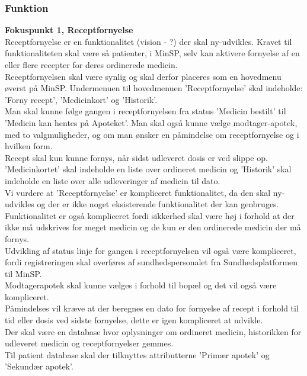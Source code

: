 \subsubsection{Funktion}  %
 \textbf{Fokuspunkt 1, Receptfornyelse}\\
 Receptfornyelse er en funktionalitet (vision - ?) der skal ny-udvikles. Kravet til funktionaliteten skal være så patienter, i MinSP, selv kan aktivere fornyelse af en eller flere recepter for deres ordinerede medicin. \\
 Receptfornyelsen skal være synlig og skal derfor placeres som en hovedmenu øverst på MinSP. Undermenuen til hovedmenuen 'Receptfornyelse' skal indeholde: 'Forny recept', 'Medicinkort' og 'Historik'.\\
 Man skal kunne følge gangen i receptfornyelsen fra status 'Medicin bestilt' til 'Medicin kan hentes på Apoteket'. Man skal også kunne vælge modtager-apotek, med to valgmuligheder, og om man ønsker en påmindelse om receptfornyelse og i hvilken form. \\ 
 Recept skal kun kunne fornys, når sidst udleveret dosis er ved slippe op.  \\
 'Medicinkortet' skal indeholde en liste over ordineret medicin og 'Historik' skal indeholde en liste over alle udleveringer af medicin til dato.\\
 Vi vurdere at 'Receptfornyelse' er kompliceret funktionalitet, da den skal ny-udvikles og der er ikke noget eksisterende funktionalitet der kan genbruges. Funktionalitet er også kompliceret fordi sikkerhed skal være høj i forhold at der ikke må udskrives for meget medicin og de kun er den ordinerede medicin der må fornys. \\
 Udvikling af status linje for gangen i receptfornyelsen vil også være kompliceret, fordi registreringen skal overføres af sundhedspersonalet fra Sundhedsplatformen til MinSP.\\
 Modtagerapotek skal kunne vælges i forhold til bopæl og det vil også være kompliceret. \\
 Påmindelses vil kræve at der beregnes en dato for fornyelse af recept i forhold til tid eller dosis ved sidste fornyelse, dette er igen kompliceret at udvikle.\\
 Der skal være en database hvor oplysninger om ordineret medicin, historikken for udleveret medicin og receptfornyelser gemmes. \\ 
 Til patient database skal der tilknyttes attributterne 'Primær apotek' og 'Sekundær apotek'.

